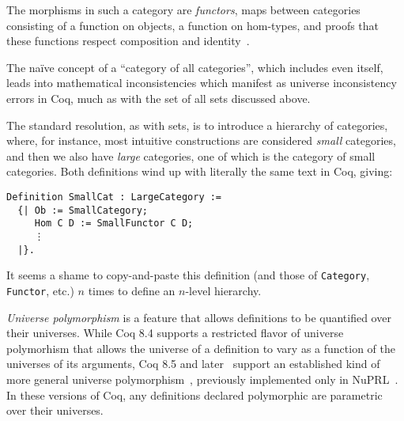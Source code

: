 The morphisms in such a category are \emph{functors},\label{sec:define-functor} maps between categories consisting of a function on objects, a function on hom-types, and proofs that these functions respect composition and identity~\cite{mac1998categories,awodey2010category,HoTTBook}.

The na\"ive concept of a ``category of all categories'',\label{sec:category-of-categories} which includes even itself, leads into mathematical inconsistencies which manifest as universe inconsistency errors in Coq, much as with the set of all sets discussed above.

The standard resolution, as with sets, is to introduce a hierarchy of categories, where, for instance, most intuitive constructions are considered \emph{small} categories, and then we also have \emph{large} categories, one of which is the category of small categories.
Both definitions wind up with literally the same text in Coq, giving:
\begin{verbatim}
Definition SmallCat : LargeCategory :=
  {| Ob := SmallCategory;
     Hom C D := SmallFunctor C D;
     ⋮
  |}.
\end{verbatim}

It seems a shame to copy-and-paste this definition (and those of \texttt{Category}, \texttt{Functor}, etc.) $n$ times to define an $n$-level hierarchy.

\emph{Universe polymorphism}\label{sec:universe-polymorphism-def} is a feature that allows definitions to be quantified over their universes.
While Coq 8.4 supports a restricted flavor of universe polymorhism that allows the universe of a definition to vary as a function of the universes of its arguments, Coq 8.5 and later~\cite{coq-commit-polyproj} support an established kind of more general universe polymorphism~\cite{Harper1991107}, previously implemented only in NuPRL~\cite{nuprl}.
In these versions of Coq, any definitions declared polymorphic are parametric over their universes.

